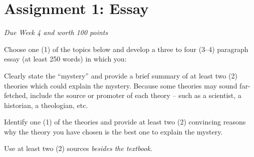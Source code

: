 \pagebreak
\section*{Assignment 1: Essay}
\emph{Due Week 4 and worth 100 points}

Choose one (1) of the topics below and develop a three to four (3--4) paragraph essay (at least 250 words) in which you:
\begin{enumerate*}
	\item Clearly state the ``mystery'' and provide a brief summary of at least two (2) theories which could explain the mystery. Because some theories may sound far-fetched, include the source or promoter of each theory – such as a scientist, a historian, a theologian, etc.
	\item Identify one (1) of the theories and provide at least two (2) convincing reasons why the theory you have chosen is the best one to explain the mystery.
	\item Use at least two (2) sources \emph{besides the textbook}.
\end{enumerate*}

